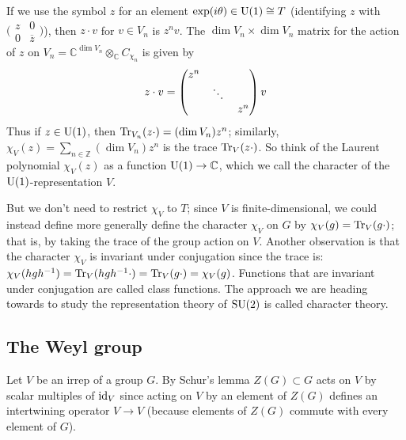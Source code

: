 \documentclass[../../rtnotes.tex]{subfiles}
\begin{document}
If we use the symbol $z$ for an element $\exp(i\theta)\in \operatorname{U}(1)\cong T$ (identifying $z$ with $\bigl(\!\begin{smallmatrix}
    z & 0 \\ 0 & \overline z
\end{smallmatrix}\!\bigr)$), then $z\cdot v$ for $v\in V_n$ is $z^nv$. The $\dim V_n\times \dim V_n$ matrix for the action of $z$ on $V_n = \mathbb C^{\dim V_n}\otimes_{\mathbb C}C_{\chi_n}$ is given by
\[z\cdot v = \begin{pmatrix}
    z^n & & \\
    & \mathbin{\rotatebox[origin=c]{-10}{$\ddots$}} & \\
    & & z^n
\end{pmatrix}v\]
Thus if $z\in\operatorname{U}(1)$, then $\Tr_{V_n}(z\cdot) = (\dim V_n)z^n$; similarly, $\chi_V(z) = \sum_{n\in\mathbb Z}(\dim V_n)z^n$ is the trace $\Tr_V(z\cdot)$. So think of the Laurent polynomial $\chi_V(z)$ as a function $\operatorname{U}(1)\to \mathbb C$, which we call the character of the $\operatorname{U}(1)$-representation $V$.

But we don't need to restrict $\chi_V$ to $T$; since $V$ is finite-dimensional, we could instead define more generally define the character $\chi_V$ on $G$ by $\chi_V(g) = \Tr_V(g\cdot)$; that is, by taking the trace of the group action on $V$. Another observation is that the character $\chi_V$ is invariant under conjugation since the trace is: $\chi_V(hgh^{-1}) = \Tr_V(hgh^{-1}\cdot) = \Tr_V(g\cdot) = \chi_V(g)$. Functions that are invariant under conjugation are called class functions. The approach we are heading towards to study the representation theory of $\operatorname{SU}(2)$ is called character theory.

\subsection{The Weyl group}
Let $V$ be an irrep of a group $G$. By Schur's lemma $Z(G)\subset G$ acts on $V$ by scalar multiples of $\operatorname{id}_V$ since acting on $V$ by an element of $Z(G)$ defines an intertwining operator $V\to V$ (because elements of $Z(G)$ commute with every element of $G$).
\end{document}
